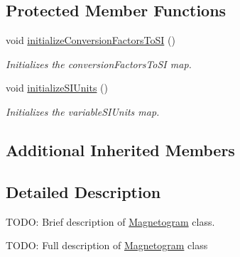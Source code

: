 \subsection*{Protected Member Functions}
\begin{DoxyCompactItemize}
\item 
void \hyperlink{classccmc_1_1_magnetogram_a45db1cbd5d18715de4da31e78590b681}{initialize\-Conversion\-Factors\-To\-S\-I} ()
\begin{DoxyCompactList}\small\item\em Initializes the conversion\-Factors\-To\-S\-I map. \end{DoxyCompactList}\item 
void \hyperlink{classccmc_1_1_magnetogram_aad6ea4de4693abb550ea316408fb644d}{initialize\-S\-I\-Units} ()
\begin{DoxyCompactList}\small\item\em Initializes the variable\-S\-I\-Units map. \end{DoxyCompactList}\end{DoxyCompactItemize}
\subsection*{Additional Inherited Members}


\subsection{Detailed Description}
T\-O\-D\-O\-: Brief description of \hyperlink{classccmc_1_1_magnetogram}{Magnetogram} class. 

T\-O\-D\-O\-: Full description of \hyperlink{classccmc_1_1_magnetogram}{Magnetogram} class 

